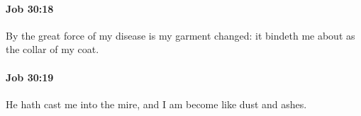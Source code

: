 		\paragraph{Job 30:18} %
			\label{JOB-30-18}

			By the great force of my disease is my garment changed: it bindeth me about as the collar of my coat.


		\paragraph{Job 30:19} %
			\label{JOB-30-19}

			He hath cast me into the mire, and I am become like dust and ashes.


